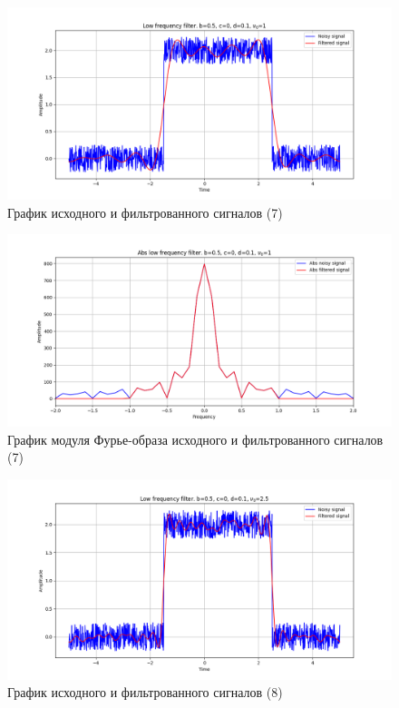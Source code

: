\documentclass[a4paper, 12pt]{article}
\begin{document}
    \begin{figure}[!htb]
        \centering
        \includegraphics[scale=0.48]{12_u_flt_u_nohigh.png}
        \captionsetup{skip=0pt}
        \caption{График исходного и фильтрованного сигналов (7)}
        \label{fig:fig13}
    \end{figure}
    \begin{figure}[!htb]
        \centering
        \includegraphics[scale=0.48]{12_abs_u_U_nohigh.png}
        \captionsetup{skip=0pt}
        \caption{График модуля Фурье-образа исходного и фильтрованного сигналов (7)}
        \label{fig:fig14}
    \end{figure}
    \begin{figure}[!htb]
        \centering
        \includegraphics[scale=0.48]{13_u_flt_u_nohigh.png}
        \captionsetup{skip=0pt}
        \caption{График исходного и фильтрованного сигналов (8)}
        \label{fig:fig15}
    \end{figure}
\end{document}
